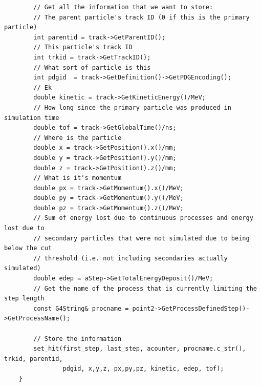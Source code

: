 \documentclass[]{article}
\begin{document}
\begin{verbatim}
        // Get all the information that we want to store:
        // The parent particle's track ID (0 if this is the primary particle)
        int parentid = track->GetParentID();
        // This particle's track ID
        int trkid = track->GetTrackID();
        // What sort of particle is this
        int pdgid  = track->GetDefinition()->GetPDGEncoding();
        // Ek
        double kinetic = track->GetKineticEnergy()/MeV;
        // How long since the primary particle was produced in simulation time
        double tof = track->GetGlobalTime()/ns;
        // Where is the particle
        double x = track->GetPosition().x()/mm;
        double y = track->GetPosition().y()/mm;
        double z = track->GetPosition().z()/mm;
        // What is it's momentum
        double px = track->GetMomentum().x()/MeV;
        double py = track->GetMomentum().y()/MeV;
        double pz = track->GetMomentum().z()/MeV;
        // Sum of energy lost due to continuous processes and energy lost due to
        // secondary particles that were not simulated due to being below the cut
        // threshold (i.e. not including secondaries actually simulated)
        double edep = aStep->GetTotalEnergyDeposit()/MeV;
        // Get the name of the process that is currently limiting the step length
        const G4String& procname = point2->GetProcessDefinedStep()->GetProcessName();
        
        // Store the information
        set_hit(first_step, last_step, acounter, procname.c_str(), trkid, parentid, 
                pdgid, x,y,z, px,py,pz, kinetic, edep, tof);
    }
\end{verbatim}

\end{document}
